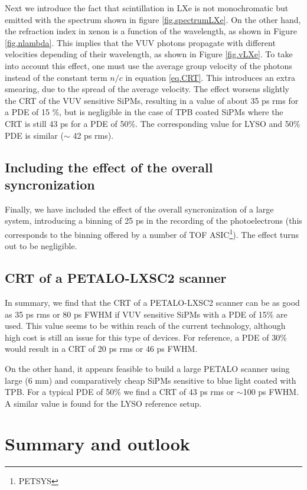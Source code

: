 \documentclass[review]{elsarticle}
\begin{document}
  Next we introduce the fact that scintillation in LXe is not monochromatic but emitted with the spectrum shown in figure \ref{fig.spectrumLXe}. On the other hand, the refraction index in xenon is a function of the wavelength, as shown in Figure \ref{fig.nlambda}. This implies that the VUV photons propagate with different velocities depending of their wavelength, as shown in Figure \ref{fig.vLXe}. To take into account this effect, one must use the average group velocity of the photons instead of the constant term $n/c$
in equation \ref{eq.CRT}. This introduces an extra smearing, due to the spread of the average velocity. The effect worsens slightly the CRT of the VUV sensitive SiPMs, resulting in a value of about 35 ps rms for a PDE of 15 \%, but is negligible in the case of TPB coated SiPMs where the CRT is still 43 ps for a PDE of 50\%. The corresponding value for LYSO and 50\% PDE is similar ($\sim$ 42 ps rms). 
  
  \subsection*{Including the effect of the overall syncronization}
  Finally, we have included the effect of the overall syncronization of a large system, introducing a binning of 25 ps in the recording of the photoelectrons (this corresponds to the binning offered by a number of TOF ASIC\footnote{PETSYS}). The effect turns out to be negligible.  
  
\subsection*{CRT of a PETALO-LXSC2 scanner}
In summary, we find that the CRT of a PETALO-LXSC2 scanner can be as good as 35 ps rms or 80 ps FWHM if VUV sensitive SiPMs with a PDE of 15\% are used. This value seems to be within reach of the current technology, although high cost is still an issue for this type of devices. For reference, a PDE of 30\% would result in a CRT of 20 ps rms or 46 ps FWHM. 

On the other hand, it appears feasible to build a large PETALO scanner using large (6 mm) and comparatively cheap SiPMs sensitive to blue light coated with TPB. For a typical PDE of 50\% we find a CRT of
43 ps rms or $\sim$100 ps FWHM. A similar value is found for the LYSO reference setup.


\section{Summary and outlook}\label{sec.conclu}
\end{document}
